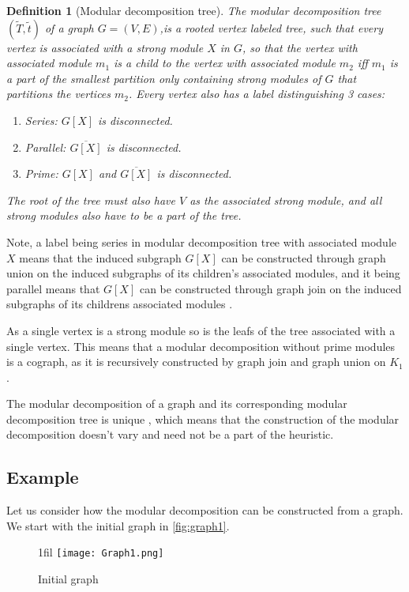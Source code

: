 \documentclass[a4paper]{article}
\makeatletter
\newtheorem{definition}{Definition}[section]
\newcommand{\T}{\widetilde{T}}
\renewcommand{\t}{\widetilde{t}}
\newcommand*{\centerfloat}{%
  \parindent \z@
  \leftskip \z@ \@plus 1fil \@minus \textwidth
  \rightskip\leftskip
  \parfillskip \z@skip}
\makeatother
\begin{document}
\begin{definition}[Modular decomposition tree]{\cite{HCL}}
    The modular decomposition tree $(\T,\t)$ of a graph $G = (V,E)$,is a rooted
    vertex labeled tree, such that every vertex is associated with a strong
    module $X$ in $G$, so that the vertex with associated module $m_1$ is a
    child to the vertex with associated module $m_2$ iff $m_1$ is a part of the
    smallest partition only containing strong modules of $G$ that partitions the
    vertices $m_2$. Every vertex also has a label distinguishing 3 cases:
    \begin{enumerate}
        \item Series: $G[X]$ is disconnected.
        \item Parallel: $\overline{G[X]}$ is disconnected.
        \item Prime: $G[X]$ and $\overline{G[X]}$ is disconnected.
    \end{enumerate}
    The root of the tree must also have $V$ as the associated strong module, and all 
    strong modules also have to be a part of the tree.
\end{definition}

Note, a label being series in modular decomposition tree with associated module
$X$ means that the induced subgraph $G[X]$ can be constructed through graph
union on the induced subgraphs of its children's associated modules, and it being
parallel means that $G[X]$ can be constructed through graph join on the
induced subgraphs of its childrens associated modules \cite{HCL}.

As a single vertex is a strong module so is the leafs of the tree associated
with a single vertex. This means that a modular decomposition without
prime modules is a cograph, as it is recursively constructed by graph join and
graph union on $K_1$.

The modular decomposition of a graph and its corresponding modular
decomposition tree is unique \cite{MDUnique}, which means that the construction
of the modular decomposition doesn't vary and need not be a part of
the heuristic.


\subsection{Example}

Let us consider how the modular decomposition can be constructed from a graph. 
We start with the initial graph in \autoref{fig:graph1}.

\begin{figure}[H]
    \centerfloat
    \texttt{[image: Graph1.png]}
    \caption{Initial graph}
    \label{fig:graph1}
\end{figure}
\end{document}
